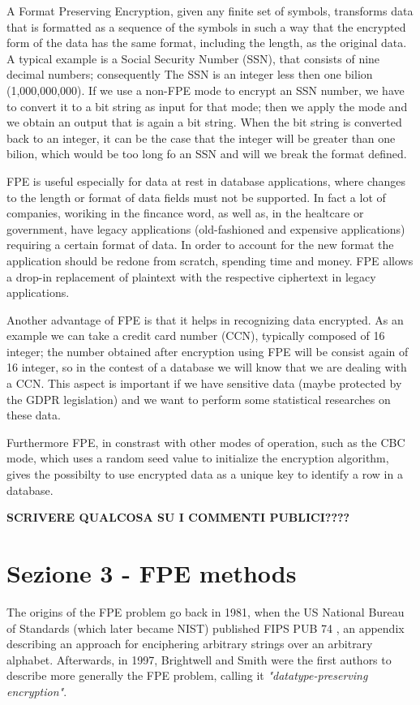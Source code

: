 A Format Preserving Encryption, given any finite set of symbols, transforms data that is formatted as a sequence of the symbols in such a way that the encrypted form of the data has the same format, including the length, as the original data.
A typical example is a Social Security Number (SSN), that consists of nine decimal numbers; consequently The SSN is an integer less then one bilion (1,000,000,000). If we use a non-FPE mode to encrypt an SSN number, we have to convert it to a bit string as input for that mode; then we apply the mode and we obtain an output that is again a bit string. When the bit string is converted back to an integer, it can be the case that the integer will be greater than one bilion, which would be too long fo an SSN and will we break the format defined.

FPE is useful especially for data at rest in database applications, where changes to the length or format of data fields must not be supported. In fact a lot of companies, woriking in the fincance word, as well as, in the healtcare or government, have legacy applications (old-fashioned and expensive applications) requiring a certain format of data. 
In order to account for the new format the application should be redone from scratch, spending time and money.
FPE allows a drop-in replacement of plaintext with the respective ciphertext in legacy applications.

Another advantage of FPE is that it helps in recognizing data encrypted. As an example we can take a credit card number (CCN), typically composed of 16 integer; the number obtained after encryption using FPE will be consist again of 16 integer, so in the contest of a database we will know that we are dealing with a CCN. 
This aspect is important if we have sensitive data (maybe protected by the GDPR legislation) and we want to perform some statistical researches on these data.

Furthermore FPE, in constrast with other modes of operation, such as the CBC mode, which uses a random seed value to initialize the encryption algorithm, gives the possibilty to use encrypted data as a unique key to identify a row in a database. 

\textbf {SCRIVERE QUALCOSA SU I COMMENTI PUBLICI????}

\section{Sezione 3 - FPE methods}

The origins of the FPE problem go back in 1981, when the US National Bureau of Standards (which later became NIST) published FIPS PUB 74 \cite{fips74}, an appendix describing an approach for enciphering arbitrary strings over an arbitrary alphabet.
Afterwards, in 1997, Brightwell and Smith were the first authors to describe more generally the FPE problem, calling it \textit{"datatype-preserving encryption"}.

